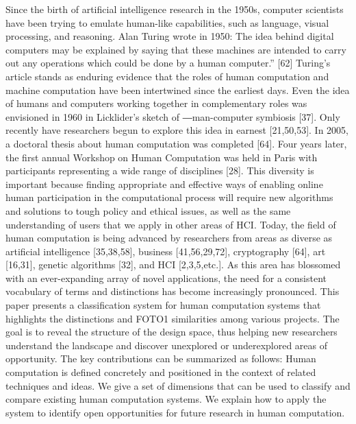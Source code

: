 \documentclass{sig-alternate}
\begin{document}
Since the birth of artificial intelligence research in the 1950s, computer scientists have been trying to emulate human-like capabilities, such as language, visual processing, and reasoning. Alan Turing wrote in 1950:
The idea behind digital computers may be explained by saying that these machines are intended to carry out any operations which could be done by a human computer.” [62]
Turing’s article stands as enduring evidence that the roles of human computation and machine computation have been intertwined since the earliest days. Even the idea of humans and computers working together in complementary roles was envisioned in 1960 in Licklider’s sketch of ―man-computer symbiosis [37]. Only recently have researchers begun to explore this idea in earnest [21,50,53].
In 2005, a doctoral thesis about human computation was completed [64]. Four years later, the first annual Workshop on Human Computation was held in Paris with participants representing a wide range of disciplines [28]. This diversity is important because finding appropriate and effective ways of enabling online human participation in the computational process will require new algorithms and solutions to tough policy and ethical issues, as well as the same understanding of users that we apply in other areas of HCI. Today, the field of human computation is being advanced by researchers from areas as diverse as artificial intelligence [35,38,58], business [41,56,29,72], cryptography [64], art [16,31], genetic algorithms [32], and HCI [2,3,5,etc.].
As this area has blossomed with an ever-expanding array of novel applications, the need for a consistent vocabulary of terms and distinctions has become increasingly pronounced.
This paper presents a classification system for human computation systems that highlights the distinctions and FOTO1 similarities among various projects. The goal is to reveal the structure of the design space, thus helping new researchers understand the landscape and discover unexplored or underexplored areas of opportunity.
The key contributions can be summarized as follows:
 Human computation is defined concretely and positioned in the context of related techniques and ideas.
 We give a set of dimensions that can be used to classify and compare existing human computation systems.
 We explain how to apply the system to identify open opportunities for future research in human computation.
\end{document}
